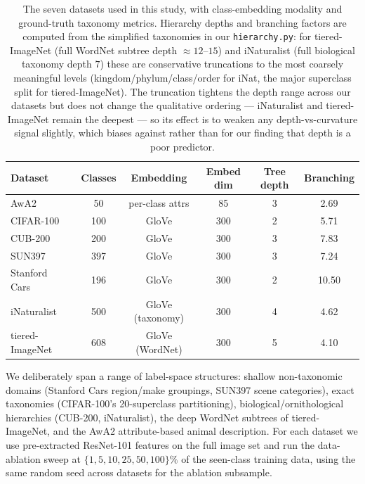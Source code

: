 \documentclass{article}
\begin{document}
\begin{table}[t]
\centering
\caption{The seven datasets used in this study, with class-embedding modality and ground-truth taxonomy metrics. Hierarchy depths and branching factors are computed from the simplified taxonomies in our \texttt{hierarchy.py}: for tiered-ImageNet (full WordNet subtree depth $\approx 12$--$15$) and iNaturalist (full biological taxonomy depth $7$) these are conservative truncations to the most coarsely meaningful levels (kingdom/phylum/class/order for iNat, the major superclass split for tiered-ImageNet). The truncation tightens the depth range across our datasets but does not change the qualitative ordering --- iNaturalist and tiered-ImageNet remain the deepest --- so its effect is to weaken any depth-vs-curvature signal slightly, which biases against rather than for our finding that depth is a poor predictor.}
\label{tab:datasets}
\begin{tabular}{lccccc}
\toprule
\textbf{Dataset} & \textbf{Classes} & \textbf{Embedding} & \textbf{Embed dim} & \textbf{Tree depth} & \textbf{Branching} \\
\midrule
AwA2~\cite{xian2018awa2} & 50 & per-class attrs & 85 & 3 & 2.69 \\
CIFAR-100~\cite{krizhevsky2009cifar} & 100 & GloVe & 300 & 2 & 5.71 \\
CUB-200~\cite{wah2011cub} & 200 & GloVe & 300 & 3 & 7.83 \\
SUN397~\cite{xiao2010sun} & 397 & GloVe & 300 & 3 & 7.24 \\
Stanford Cars~\cite{krause2013cars} & 196 & GloVe & 300 & 2 & 10.50 \\
iNaturalist~\cite{vanhorn2021inaturalist} & 500 & GloVe (taxonomy) & 300 & 4 & 4.62 \\
tiered-ImageNet~\cite{ren2018tiered} & 608 & GloVe (WordNet) & 300 & 5 & 4.10 \\
\bottomrule
\end{tabular}
\end{table}

We deliberately span a range of label-space structures: shallow non-taxonomic domains (Stanford Cars region/make groupings, SUN397 scene categories), exact taxonomies (CIFAR-100's 20-superclass partitioning), biological/ornithological hierarchies (CUB-200, iNaturalist), the deep WordNet subtrees of tiered-ImageNet, and the AwA2 attribute-based animal description.
For each dataset we use pre-extracted ResNet-101 features on the full image set and run the data-ablation sweep at $\{1, 5, 10, 25, 50, 100\}\%$ of the seen-class training data, using the same random seed across datasets for the ablation subsample.
\end{document}
